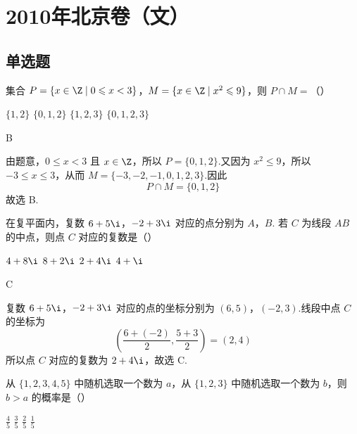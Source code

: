 
\chapter{2010年北京卷（文）}

\section{单选题}

\begin{problem}
集合 \(P = \{x \in \Z \mid 0 \leqslant x < 3\}\)，\(M = \{x \in \Z \mid x^2 \leqslant 9\}\)，则 \(P \cap M =\)（\quad）

\choices
    {\( \{1, 2\} \)}
    {\(\{0, 1, 2\}\)}
    {\(\{1, 2, 3\}\)}
    {\(\{0, 1, 2, 3\}\)}
\end{problem}

\begin{answer}
B
\end{answer}

\begin{solution}
由题意，\(0\leqslant x<3\) 且 \(x\in\Z\)，所以 \(P=\{0,1,2\}\).又因为 \(x^2\leqslant9\)，所以 \(-3\leqslant x\leqslant3\)，从而 \(M=\{-3,-2,-1,0,1,2,3\}\).因此
\[
P\cap M=\{0,1,2\}
\]
故选 B.
\end{solution}

\begin{problem}
在复平面内，复数 \(6 + 5\i\)，\(-2 + 3\i\) 对应的点分别为 \(A\)，\(B\). 若 \(C\) 为线段 \(AB\) 的中点，则点 \(C\) 对应的复数是（\quad）

\choices
    {\(4 + 8\i\)}
    {\(8 + 2\i\)}
    {\(2 + 4\i\)}
    {\(4 + \i\)}
\end{problem}

\begin{answer}
C
\end{answer}

\begin{solution}
复数 \(6+5\i\)，\(-2+3\i\) 对应的点的坐标分别为 \((6,5)\)，\((-2,3)\).线段中点 \(C\) 的坐标为
\[
\left(\frac{6+(-2)}{2},\frac{5+3}{2}\right)=(2,4)
\]
所以点 \(C\) 对应的复数为 \(2+4\i\)，故选 C.
\end{solution}

\begin{problem}
从 \(\{1,2,3,4,5\}\) 中随机选取一个数为 \(a\)，从 \(\{1,2,3\}\) 中随机选取一个数为 \(b\)，则 \(b > a\) 的概率是（\quad）

\choices
    {\( \frac{4}{5} \)}
    {\( \frac{3}{5} \)}
    {\( \frac{2}{5} \)}
    {\( \frac{1}{5} \)}
\end{problem}

